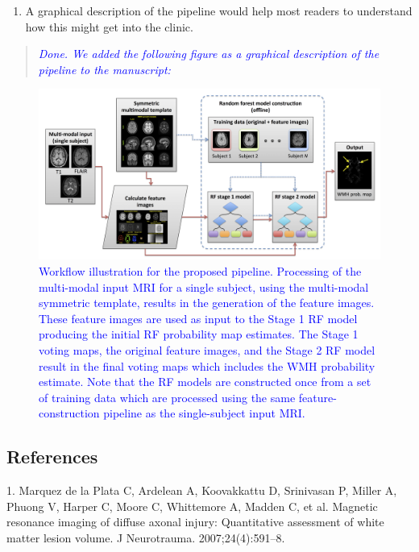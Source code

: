 \documentclass[12pt,]{article}
\providecommand{\tightlist}{%
  \setlength{\itemsep}{0pt}\setlength{\parskip}{0pt}}
\begin{document}
\begin{enumerate}
\def\labelenumi{\arabic{enumi}.}
\setcounter{enumi}{1}
\tightlist
\item
  A graphical description of the pipeline would help most readers to
  understand how this might get into the clinic.
\end{enumerate}

\begin{quote}
\emph{\textcolor{blue}{Done.  We added the following figure as a graphical description of
the pipeline to the manuscript:}}
\end{quote}

\begin{figure}[htbp]
\centering
\includegraphics{Figures/wmhPipeline.png}
\caption{\textcolor{blue}{Workflow illustration for the proposed pipeline.  Processing of the multi-modal
input MRI for a single subject, using the multi-modal symmetric template, results in
the generation of the feature images.  These feature images are used as input to the
Stage 1 RF model producing the initial RF probability map estimates.  The Stage 1
voting maps, the original feature images, and the Stage 2 RF model result in the
final voting maps which includes the WMH probability estimate.  Note that the RF models
are constructed once from a set of training data which are processed using the
same feature-construction pipeline as the single-subject input MRI.}}
\end{figure}

\clearpage

\subsection*{References}\label{references}

\hypertarget{refs}{}
\hypertarget{ref-Marquez-de-la-Plata:2007aa}{}
1. Marquez de la Plata C, Ardelean A, Koovakkattu D, Srinivasan P,
Miller A, Phuong V, Harper C, Moore C, Whittemore A, Madden C, et al.
Magnetic resonance imaging of diffuse axonal injury: Quantitative
assessment of white matter lesion volume. J Neurotrauma.
2007;24(4):591--8.
\end{document}
